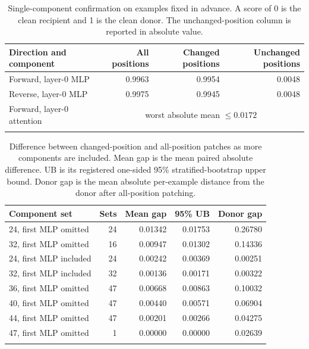 \documentclass[pdflatex,sn-nature]{sn-jnl}
\begin{document}
\begin{table}[ht]
\caption{Single-component confirmation on examples fixed in advance. A score
of 0 is the clean recipient and 1 is the clean donor. The unchanged-position
column is reported in absolute value.}
\label{tab:micro}
\centering
\begin{tabular}{@{}lrrr@{}}
\toprule
Direction and component & All positions & Changed positions & Unchanged positions \\
\midrule
Forward, layer-0 MLP & 0.9963 & 0.9954 & 0.0048 \\
Reverse, layer-0 MLP & 0.9975 & 0.9945 & 0.0048 \\
Forward, layer-0 attention & \multicolumn{3}{c}{worst absolute mean $\leq 0.0172$} \\
\botrule
\end{tabular}
\end{table}

\begin{table}[ht]
\caption{Difference between changed-position and all-position patches as more
components are included. Mean gap is the mean paired absolute difference. UB
is its registered one-sided 95\% stratified-bootstrap upper bound. Donor gap is
the mean absolute per-example distance from the donor after all-position
patching.}
\label{tab:scale}
\centering
\small
\setlength{\tabcolsep}{3pt}
\begin{tabular}{@{}lrrrr@{}}
\toprule
Component set & Sets & Mean gap & 95\% UB & Donor gap \\
\midrule
24, first MLP omitted & 24 & 0.01342 & 0.01753 & 0.26780 \\
32, first MLP omitted & 16 & 0.00947 & 0.01302 & 0.14336 \\
24, first MLP included & 24 & 0.00242 & 0.00369 & 0.00251 \\
32, first MLP included & 32 & 0.00136 & 0.00171 & 0.00322 \\
36, first MLP omitted & 47 & 0.00668 & 0.00863 & 0.10032 \\
40, first MLP omitted & 47 & 0.00440 & 0.00571 & 0.06904 \\
44, first MLP omitted & 47 & 0.00201 & 0.00266 & 0.04275 \\
47, first MLP omitted & 1 & 0.00000 & 0.00000 & 0.02639 \\
\botrule
\end{tabular}
\end{table}
\end{document}
